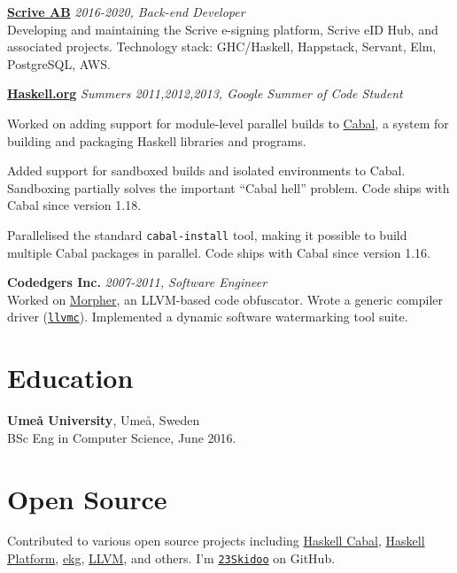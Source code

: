 \documentclass[margin,line]{res}
\begin{document}
\begin{resume}
        {\bf \href{https://scrive.com}{Scrive AB}} \hfill {\it 2016-2020, Back-end Developer}\\
    Developing and maintaining the Scrive e-signing platform, Scrive eID
    Hub, and associated projects.
    Technology stack: GHC/Haskell, Happstack, Servant, Elm, PostgreSQL, AWS.

        {\bf \href{https://haskell.org}{Haskell.org}} \hfill {\it Summers 2011,2012,2013, Google Summer of Code Student}\\
    \begin{list}{}{\leftmargin=1.5em}
        \item Worked on adding support for module-level parallel builds to
              \href{https://haskell.org/cabal}{Cabal}, a system for building and
              packaging Haskell libraries and programs.

        \item Added support for sandboxed builds and isolated environments to
              Cabal. Sandboxing partially solves the important ``Cabal hell'' problem. Code
              ships with Cabal since version 1.18.

        \item Parallelised the standard \texttt{cabal-install} tool, making it possible to
              build multiple Cabal packages in parallel. Code ships with Cabal since version
              1.16.
    \end{list}

    {\bf Codedgers Inc.} \hfill {\it 2007-2011, Software Engineer}\\
    Worked on \href{https://archive.is/ZAI8z}{Morpher}, an LLVM-based code
    obfuscator. Wrote a generic compiler driver
    (\href{https://llvm.org/releases/2.9/docs/CompilerDriver.html}{\texttt{llvmc}}). Implemented
    a dynamic software watermarking tool suite.

    \section{\sc Education}
     {\bf Umeå University}, Umeå, Sweden\\
    BSc Eng in Computer Science, June 2016.

    \section{\sc Open Source}

    Contributed to various open source projects including
    \href{https://github.com/haskell/cabal/}{Haskell Cabal}, \href{https://www.haskell.org/platform/}{Haskell Platform},
    \href{https://hackage.haskell.org/package/ekg}{ekg}, \href{https://llvm.org/}{LLVM}, and others.
    I'm \href{https://github.com/23Skidoo/}{\tt 23Skidoo} on GitHub.


\end{resume}
\end{document}
